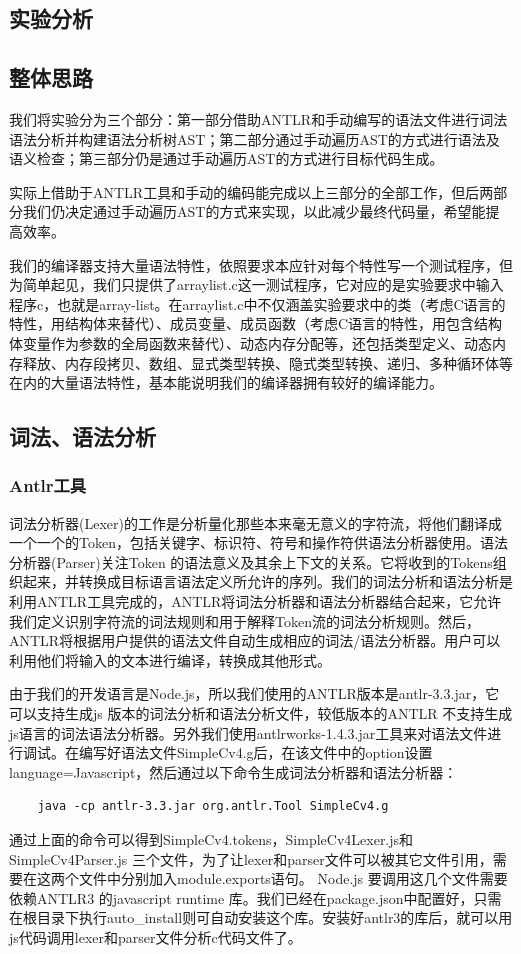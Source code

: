 \documentclass[a4paper]{article}
\begin{document}
\begin{CJK*}{UTF8}{gbsn}
    \section{实验分析}
    \subsection{整体思路}
    我们将实验分为三个部分：第一部分借助ANTLR和手动编写的语法文件进行词法语法分析并构建语法分析树AST；第二部分通过手动遍历AST的方式进行语法及语义检查；第三部分仍是通过手动遍历AST的方式进行目标代码生成。
    \par 实际上借助于ANTLR工具和手动的编码能完成以上三部分的全部工作，但后两部分我们仍决定通过手动遍历AST的方式来实现，以此减少最终代码量，希望能提高效率。
    \par 我们的编译器支持大量语法特性，依照要求本应针对每个特性写一个测试程序，但为简单起见，我们只提供了arraylist.c这一测试程序，它对应的是实验要求中输入程序c，也就是array-list。在arraylist.c中不仅涵盖实验要求中的类（考虑C语言的特性，用结构体来替代）、成员变量、成员函数（考虑C语言的特性，用包含结构体变量作为参数的全局函数来替代）、动态内存分配等，还包括类型定义、动态内存释放、内存段拷贝、数组、显式类型转换、隐式类型转换、递归、多种循环体等在内的大量语法特性，基本能说明我们的编译器拥有较好的编译能力。

    \subsection{词法、语法分析}

    \subsubsection{Antlr工具}
    词法分析器(Lexer)的工作是分析量化那些本来毫无意义的字符流，将他们翻译成一个一个的Token，包括关键字、标识符、符号和操作符供语法分析器使用。语法分析器(Parser)关注Token 的语法意义及其余上下文的关系。它将收到的Tokens组织起来，并转换成目标语言语法定义所允许的序列。我们的词法分析和语法分析是利用ANTLR工具完成的，ANTLR将词法分析器和语法分析器结合起来，它允许我们定义识别字符流的词法规则和用于解释Token流的词法分析规则。然后，ANTLR将根据用户提供的语法文件自动生成相应的词法/语法分析器。用户可以利用他们将输入的文本进行编译，转换成其他形式。
    \par 由于我们的开发语言是Node.js，所以我们使用的ANTLR版本是antlr-3.3.jar，它可以支持生成js 版本的词法分析和语法分析文件，较低版本的ANTLR 不支持生成js语言的词法语法分析器。另外我们使用antlrworks-1.4.3.jar工具来对语法文件进行调试。在编写好语法文件SimpleCv4.g后，在该文件中的option设置language=Javascript，然后通过以下命令生成词法分析器和语法分析器：
    \begin{verbatim}
    java -cp antlr-3.3.jar org.antlr.Tool SimpleCv4.g
    \end{verbatim}
    \par 通过上面的命令可以得到SimpleCv4.tokens，SimpleCv4Lexer.js和SimpleCv4Parser.js 三个文件，为了让lexer和parser文件可以被其它文件引用，需要在这两个文件中分别加入module.exports语句。 Node.js 要调用这几个文件需要依赖ANTLR3 的javascript runtime 库。我们已经在package.json中配置好，只需在根目录下执行auto\_install则可自动安装这个库。安装好antlr3的库后，就可以用js代码调用lexer和parser文件分析c代码文件了。

\end{CJK*}
\end{document}
